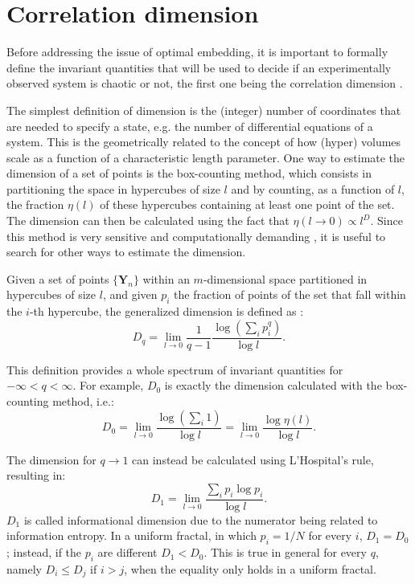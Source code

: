 \section{Correlation dimension}
\label{sec: correlation dimension}

Before addressing the issue of optimal embedding, it is important to formally define the invariant
quantities that will be used to decide if an experimentally observed system is chaotic or not,
the first one being the correlation dimension \cite{ref:abarbanel_fourier_spectra}.

The simplest definition of dimension is the (integer) number of coordinates that are
needed to specify a state, e.g. the number of differential equations of a system.
This is the geometrically related to the concept of how (hyper) volumes scale as a
function of a characteristic length parameter.
One way to estimate the dimension of a set of points is the box-counting method, which consists in partitioning the space in
hypercubes of size $l$ and by counting, as a function of $l$, the fraction $\eta(l)$ of
these hypercubes containing at least one point of the set. The dimension can then be calculated
using the fact that $\eta(l\rightarrow0)\propto l^D$. Since this method is
very sensitive and computationally demanding \cite{ref:greenside1982impracticality},
it is useful to search for other ways to estimate the dimension.

Given a set of points $\{\mathbf{Y}_n\}$ within an $m$-dimensional space partitioned in hypercubes
of size $l$, and given $p_i$
the fraction of points of the set that fall within the $i$-th hypercube,
the generalized dimension is defined as \cite{ref:fractal_dim}:
\begin{equation}
    \label{eq: generalized dimension}
    D_q=\lim_{l\rightarrow0}\frac{1}{q-1}\frac{\log(\sum_i p_i^q)}{\log l}.
\end{equation}

This definition provides a whole spectrum of invariant quantities for $-\infty<q<\infty$.
For example, $D_0$ is exactly the dimension calculated with the box-counting method, i.e.:
\begin{equation}
    \label{eq: D_0}
    D_0=\lim_{l\rightarrow0}\frac{\log(\sum_i1)}{\log l}
    =\lim_{l\rightarrow0}\frac{\log\eta(l)}{\log l}.
\end{equation}

The dimension for $q\rightarrow1$ can instead be calculated using L'Hospital's rule, resulting in:
\begin{equation}
    \label{eq: D_1}
    D_1=\lim_{l\rightarrow0}\frac{\sum_i p_i\log p_i}{\log l}.
\end{equation}
$D_1$ is called informational dimension \cite{ref:abarbanel_fourier_spectra} due to the numerator
being related to information entropy. In a uniform fractal, in which
$p_i=1/N$ for every $i$, $D_1=D_0$; instead, if the $p_i$ are different $D_1<D_0$.
This is true in general for every $q$, namely $D_i\leq D_j$ if $i>j$, when the equality only
holds in a uniform fractal.

